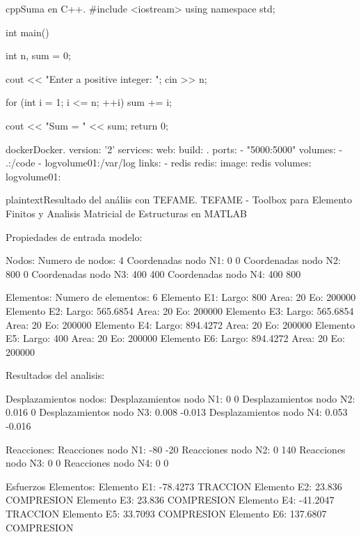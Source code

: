\newpage
\begin{sourcecode}{cpp}{Suma en C++.}
#include <iostream>
using namespace std;

int main()
{
	int n, sum = 0;
	
	cout << "Enter a positive integer: ";
	cin >> n;
	
	for (int i = 1; i <= n; ++i) {
		sum += i;
	}
	
	cout << "Sum = " << sum;
	return 0;
}
\end{sourcecode}

\begin{sourcecode}{docker}{Docker.}
version: '2'
services:
web:
build: .
ports:
- "5000:5000"
volumes:
- .:/code
- logvolume01:/var/log
links:
- redis
redis:
image: redis
volumes:
logvolume01: {}
\end{sourcecode}

\begin{sourcecode}{plaintext}{Resultado del análiis con TEFAME.}
TEFAME - Toolbox para Elemento Finitos y Analisis
Matricial de Estructuras en MATLAB

Propiedades de entrada modelo:

Nodos: 
Numero de nodos: 4 
Coordenadas nodo N1: 0 0
Coordenadas nodo N2: 800 0
Coordenadas nodo N3: 400 400
Coordenadas nodo N4: 400 800

Elementos: 
Numero de elementos: 6 
Elemento E1:	Largo: 800         Area: 20        Eo: 200000    
Elemento E2:	Largo: 565.6854    Area: 20        Eo: 200000    
Elemento E3:	Largo: 565.6854    Area: 20        Eo: 200000    
Elemento E4:	Largo: 894.4272    Area: 20        Eo: 200000    
Elemento E5:	Largo: 400         Area: 20        Eo: 200000    
Elemento E6:	Largo: 894.4272    Area: 20        Eo: 200000    

Resultados del analisis:

Desplazamientos nodos: 
Desplazamientos nodo N1: 0 0
Desplazamientos nodo N2: 0.016 0
Desplazamientos nodo N3: 0.008 -0.013
Desplazamientos nodo N4: 0.053 -0.016

Reacciones: 
Reacciones nodo N1: -80 -20
Reacciones nodo N2: 0 140
Reacciones nodo N3: 0 0
Reacciones nodo N4: 0 0

Esfuerzos Elementos: 
Elemento E1: -78.4273       TRACCION
Elemento E2: 23.836         COMPRESION
Elemento E3: 23.836         COMPRESION
Elemento E4: -41.2047       TRACCION
Elemento E5: 33.7093        COMPRESION
Elemento E6: 137.6807       COMPRESION
\end{sourcecode}

